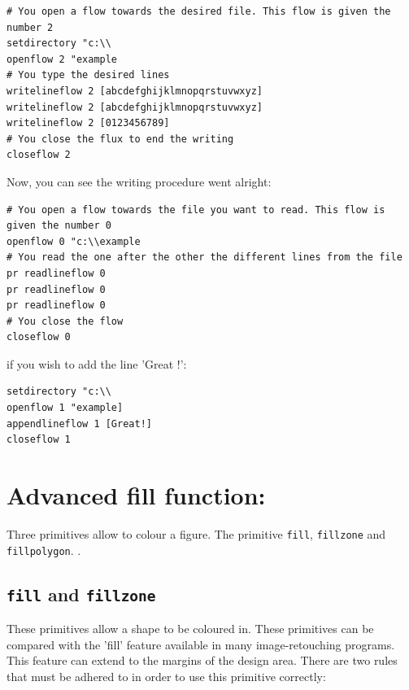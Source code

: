 \begin{verbatim}
# You open a flow towards the desired file. This flow is given the number 2
setdirectory "c:\\
openflow 2 "example
# You type the desired lines
writelineflow 2 [abcdefghijklmnopqrstuvwxyz]
writelineflow 2 [abcdefghijklmnopqrstuvwxyz]
writelineflow 2 [0123456789]
# You close the flux to end the writing
closeflow 2
\end{verbatim}
Now, you can see the writing procedure went alright:
\begin{verbatim}
# You open a flow towards the file you want to read. This flow is given the number 0
openflow 0 "c:\\example
# You read the one after the other the different lines from the file
pr readlineflow 0
pr readlineflow 0
pr readlineflow 0
# You close the flow
closeflow 0
\end{verbatim}
\noindent if you wish to add the line 'Great !':
\begin{verbatim}
setdirectory "c:\\
openflow 1 "example]
appendlineflow 1 [Great!]
closeflow 1
\end{verbatim}
\section{Advanced fill function:} 
Three primitives allow to colour a figure. The primitive \texttt{fill}, \texttt{fillzone} and \texttt{fillpolygon}.  .
\subsection{\texttt{fill} and \texttt{fillzone}}
These primitives allow a shape to be coloured in. These
primitives can be compared with the 'fill' feature available
in many image-retouching programs. This feature can extend to the
margins of the design area. There are two rules that must be adhered
to in order to use this primitive correctly: 

